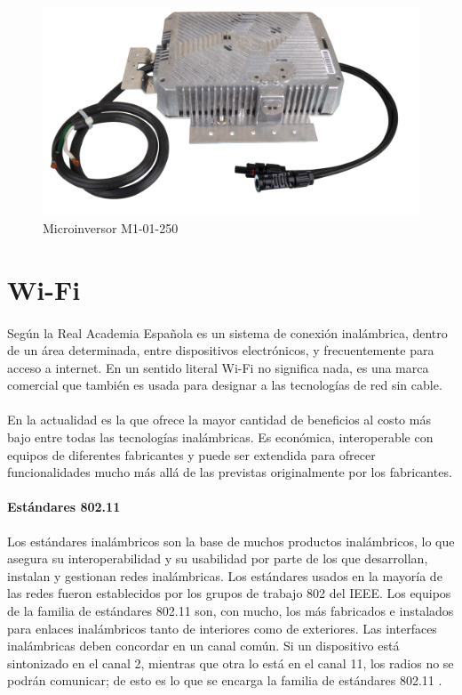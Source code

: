 \begin{figure}[H]
	\centering
	\includegraphics[scale=.20]{Capitulo2/images/microinversor.png}
	\caption{Microinversor M1-01-250}
	\label{fig:diagrama_dispensador}
\end{figure}
 
 
 \section{Wi-Fi}
 \paragraph{}
 Según la Real Academia Española es un sistema de conexión inalámbrica, dentro de un área determinada, entre dispositivos electrónicos, y frecuentemente para acceso a internet. En un sentido literal Wi-Fi no significa nada, es una marca comercial que también es usada para designar a las tecnologías de red sin cable.
 \paragraph{}
 En la actualidad es la que ofrece la mayor cantidad de beneficios al costo más bajo entre todas las tecnologías inalámbricas. Es económica, interoperable con equipos de diferentes fabricantes y puede ser extendida para ofrecer funcionalidades mucho más allá de las previstas originalmente por los fabricantes.
 
 \paragraph{Estándares 802.11}Los estándares inalámbricos son la base de muchos productos inalámbricos, lo que asegura su interoperabilidad y su usabilidad por parte de los que desarrollan, instalan y gestionan redes inalámbricas. Los estándares usados en la mayoría de las redes fueron establecidos por los grupos de trabajo 802 del IEEE. Los equipos de la familia de estándares 802.11 son, con mucho, los más fabricados e instalados para enlaces inalámbricos tanto de interiores como de exteriores. Las interfaces inalámbricas deben concordar en un canal común. Si un dispositivo está sintonizado en el canal 2, mientras que otra lo está en el canal 11, los radios no se podrán comunicar; de esto es lo que se encarga la familia de estándares 802.11 \citep{MarcoTeoricoWifi}.
